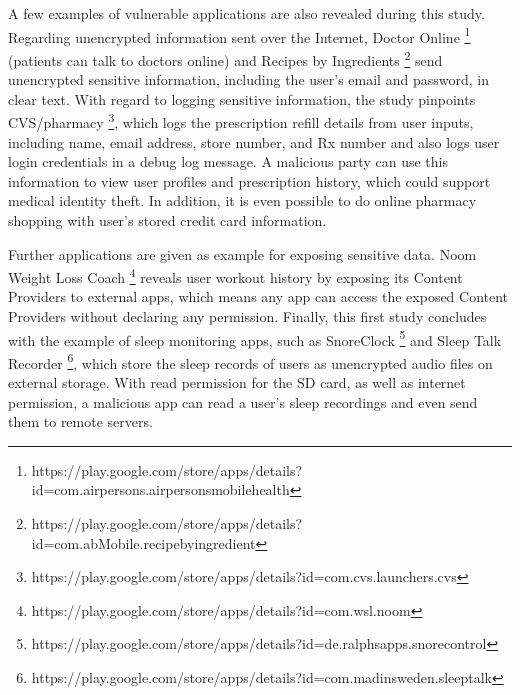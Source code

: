 A few examples of vulnerable applications are also revealed during this study. Regarding unencrypted information sent over the Internet, Doctor Online \footnote{https://play.google.com/store/apps/details?id=com.airpersons.airpersonsmobilehealth} (patients can talk to doctors online) and Recipes by Ingredients \footnote{https://play.google.com/store/apps/details?id=com.abMobile.recipebyingredient} send unencrypted sensitive information, including the user's email and password, in clear text. With regard to logging sensitive information, the study pinpoints CVS/pharmacy \footnote{https://play.google.com/store/apps/details?id=com.cvs.launchers.cvs}, which logs the prescription refill details from user inputs, including name, email address, store number, and Rx number and also logs user login credentials in a debug log message. A malicious party can use this information to view user profiles and prescription history, which could support medical identity theft. In addition, it is even possible to do online pharmacy shopping with user's stored credit card information.

Further applications are given as example for exposing sensitive data. Noom Weight Loss Coach \footnote{https://play.google.com/store/apps/details?id=com.wsl.noom} reveals user workout history by exposing its Content Providers to external apps, which means any app can access the exposed Content Providers without declaring any permission. Finally, this first study concludes with the example of sleep monitoring apps, such as SnoreClock \footnote{https://play.google.com/store/apps/details?id=de.ralphsapps.snorecontrol} and Sleep Talk Recorder \footnote{https://play.google.com/store/apps/details?id=com.madinsweden.sleeptalk}, which store the sleep records of users as unencrypted audio files on external storage. With read permission for the SD card, as well as internet permission, a malicious app can read a user's sleep recordings and even send them to remote servers.

